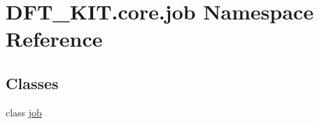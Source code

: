 \hypertarget{namespace_d_f_t___k_i_t_1_1core_1_1job}{\section{D\+F\+T\+\_\+\+K\+I\+T.\+core.\+job Namespace Reference}
\label{namespace_d_f_t___k_i_t_1_1core_1_1job}
}
\subsection*{Classes}
\begin{DoxyCompactItemize}
\item 
class \hyperlink{class_d_f_t___k_i_t_1_1core_1_1job_1_1job}{job}
\end{DoxyCompactItemize}

